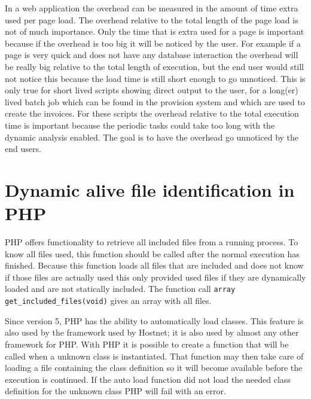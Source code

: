 In a web application the overhead can be measured in the amount of time extra used per page load. The overhead relative to the total length of the page load is not of much importance. Only the time that is extra used for a page is important because if the overhead is too big it will be noticed by the user. For example if a page is very quick and does not have any database interaction the overhead will be really big relative to the total length of execution, but the end user would still not notice this because the load time is still short enough to go unnoticed. This is only true for short lived scripts showing direct output to the user, for a long(er) lived batch job which can be found in the provision system and which are used to create the invoices. For these scripts the overhead relative to the total execution time is important because the periodic tasks could take too long with the dynamic analysis enabled. The goal is to have the overhead go unnoticed by the end users.

\section{Dynamic alive file identification in PHP}
\label{sec:alive}

PHP offers functionality to retrieve all included files from a running process. To know all files used, this function should be called after the normal execution has finished. Because this function loads all files that are included and does not know if those files are actually used this only provided used files if they are dynamically loaded and are not statically included.  The function call \verb|array get_included_files(void)| gives an array with all files.


Since version 5, PHP has the ability to automatically load classes. This feature is also used by  the framework used by Hostnet\cite{potencier2010}; it is also used by almost any other framework for PHP. With PHP it is possible to create a function that will be called when a unknown class is instantiated. That function may then take care of loading a file containing the class definition so it will become available before the execution is continued. If the auto load function did not load the needed class definition for the unknown class PHP will fail with an error\cite{php}.

